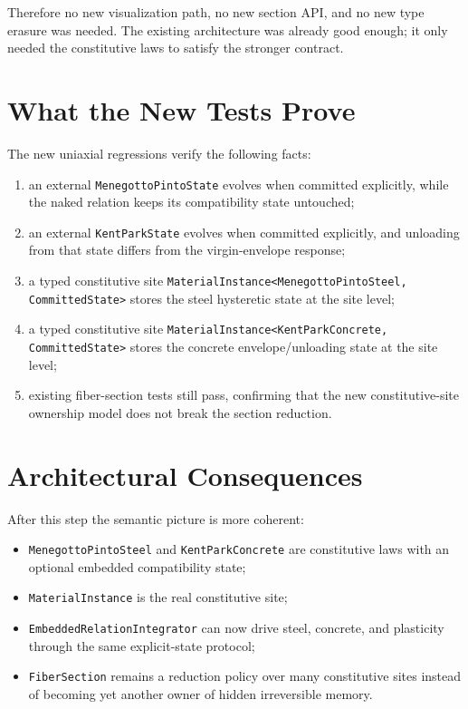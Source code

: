 Therefore no new visualization path, no new section API, and no new type
erasure was needed.  The existing architecture was already good enough; it
only needed the constitutive laws to satisfy the stronger contract.

\section{What the New Tests Prove}

The new uniaxial regressions verify the following facts:

\begin{enumerate}
  \item an external \texttt{MenegottoPintoState} evolves when committed
        explicitly, while the naked relation keeps its compatibility state
        untouched;
  \item an external \texttt{KentParkState} evolves when committed explicitly,
        and unloading from that state differs from the virgin-envelope
        response;
  \item a typed constitutive site
        \texttt{MaterialInstance<MenegottoPintoSteel, CommittedState>} stores
        the steel hysteretic state at the site level;
  \item a typed constitutive site
        \texttt{MaterialInstance<KentParkConcrete, CommittedState>} stores the
        concrete envelope/unloading state at the site level;
  \item existing fiber-section tests still pass, confirming that the new
        constitutive-site ownership model does not break the section reduction.
\end{enumerate}

\section{Architectural Consequences}

After this step the semantic picture is more coherent:

\begin{itemize}
  \item \texttt{MenegottoPintoSteel} and \texttt{KentParkConcrete} are
        constitutive laws with an optional embedded compatibility state;
  \item \texttt{MaterialInstance} is the real constitutive site;
  \item \texttt{EmbeddedRelationIntegrator} can now drive steel, concrete, and
        plasticity through the same explicit-state protocol;
  \item \texttt{FiberSection} remains a reduction policy over many constitutive
        sites instead of becoming yet another owner of hidden irreversible
        memory.
\end{itemize}

